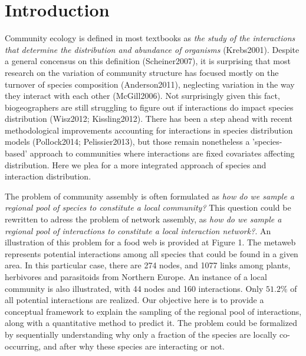 \documentclass[12pt]{article}
\begin{document}
\section*{Introduction}

Community ecology is defined in most textbooks as \emph{the study of the
interactions that determine the distribution and abundance of organisms}
(Krebs2001). Despite a general concensus on this definition (Scheiner2007), it
is surprising that most research on the variation of community structure has
focused mostly on the turnover of species composition (Anderson2011),
neglecting variation in the way they interact with each other (McGill2006).
Not surprisingly given this fact, biogeographers are still struggling to
figure out if interactions do impact species distribution (Wisz2012;
Kissling2012). There has been a step ahead with recent methodological
improvements accounting for interactions in species distribution models
(Pollock2014; Pelissier2013), but those remain nonetheless a 'species- based'
approach to communities where interactions are fixed covariates affecting
distribution. Here we plea for a more integrated approach of species and
interaction distribution.

The problem of community assembly is often formulated as \emph{how do we
sample a regional pool of species to constitute a local community?} This
question could be rewritten to adress the problem of network assembly, as
\emph{how do we sample a regional pool of interactions to constitute a local
interaction network?}. An illustration of this problem for a food web is
provided at Figure 1. The metaweb represents potential interactions among all
species that could be found in a given area. In this particular case, there
are 274 nodes, and 1077 links among plants, herbivores and parasitoids from
Northern Europe. An instance of a local community is also illustrated, with 44
nodes and 160 interactions. Only $51.2\%$ of all potential interactions are
realized. Our objective here is to provide a conceptual framework to explain
the sampling of the regional pool of interactions, along with a quantitative
method to predict it. The problem could be formalized by sequentially
understanding why only a fraction of the species are locally co-occurring, and
after why these species are interacting or not.
\end{document}
